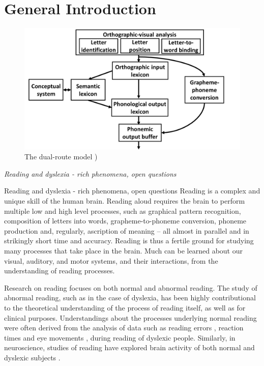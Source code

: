 \chapter*{General Introduction}
\begin{figure}[H]
\vspace{.3in}
\includegraphics[width=\linewidth]{Figures/Ch1/DualRoute}
\caption{The dual-route model \citep{friedmann2016types})}
\end{figure}

\textit{Reading and dyslexia - rich phenomena, open questions}

Reading and dyslexia - rich phenomena, open questions
Reading is a complex and unique skill of the human brain. Reading aloud requires the brain to perform multiple low and high level processes, such as graphical pattern recognition, composition of letters into words, grapheme-to-phoneme conversion, phoneme production and, regularly, ascription of meaning – all almost in parallel and in strikingly short time and accuracy. Reading is thus a fertile ground for studying many processes that take place in the brain. Much can be learned about our visual, auditory, and motor systems, and their interactions, from the understanding of reading processes.

Research on reading focuses on both normal and abnormal reading. The study of abnormal reading, such as in the case of dyslexia, has been highly contributional to the theoretical understanding of the process of reading itself, as well as for clinical purposes. Understandings about the processes underlying normal reading were often derived from the analysis of data such as reading errors \citep{mn73, ck12}, reaction times \citep{s98, s00} and eye movements \citep{jainta2011dyslexic}, during reading of dyslexic people. Similarly, in neuroscience, studies of reading have explored brain activity of both normal and dyslexic subjects \citep{gaab2007neural, shaywitz2002disruption, price2012review}.

